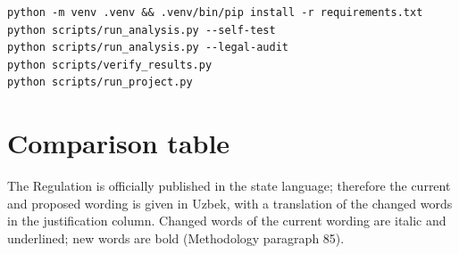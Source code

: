 \documentclass[14pt,a4paper]{extarticle}
\begin{document}
\begingroup\fontsize{11bp}{13.2bp}\selectfont
\begin{verbatim}
python -m venv .venv && .venv/bin/pip install -r requirements.txt
python scripts/run_analysis.py --self-test
python scripts/run_analysis.py --legal-audit
python scripts/verify_results.py
python scripts/run_project.py
\end{verbatim}
\endgroup

\section{Comparison table}\label{sec:cmp}
The Regulation is officially published in the state language; therefore the current and proposed wording is given in Uzbek, with a translation of the changed words in the justification column. Changed words of the current wording are italic and underlined; new words are bold (Methodology paragraph 85).
\end{document}
